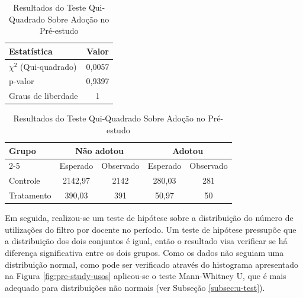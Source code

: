 
\begin{table}[h]
    \centering
    \caption{Resultados do Teste Qui-Quadrado Sobre Adoção no Pré-estudo}
    \label{tab:pre-study-adocao}

    \begin{tabular}{lc}
        \hline
        Estatística & Valor \\ \hline
        $\chi^2$ (Qui-quadrado) & 0,0057 \\
        p-valor & 0,9397 \\  
        Graus de liberdade & 1 \\ \hline
    \end{tabular}

    \vspace{0.5cm} %

    \begin{tabular}{lcccc}
        \hline
        \multirow{2}{*}{Grupo} & \multicolumn{2}{c}{Não adotou} & \multicolumn{2}{c}{Adotou} \\ 
        \cline{2-5}
        & Esperado & Observado & Esperado & Observado \\ \hline
        Controle & 2142,97 & 2142 & 280,03 & 281 \\
        Tratamento & 390,03 & 391 & 50,97 & 50 \\ \hline
    \end{tabular}

    \begin{center}
    \end{center}
\end{table}


Em seguida, realizou-se um teste de hipótese sobre a distribuição do número de utilizações do filtro por docente no período. Um teste de hipótese pressupõe que a distribuição dos dois conjuntos é igual, então o resultado visa verificar se há diferença significativa entre os dois grupos. Como os dados não seguiam uma distribuição normal, como pode ser verificado através do histograma apresentado na Figura \ref{fig:pre-study-usos} aplicou-se o teste Mann-Whitney U, que é mais adequado para distribuições não normais (ver Subseção \ref{subsec:u-test}).

